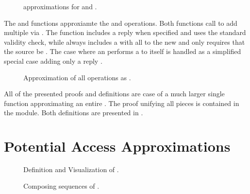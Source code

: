   
\begin{figure}
  \COQDOCcreateDepAG{}
  \COQDOCsendDepAG{}
  \COQDOCagAddCapsSend{}
  \COQDOCagAddCapsCreate{}
  \COQDOCagAddCapsByIndexPairList{}
  \COQDOCdirAccMDepCreate{}
  \COQDOCdirAccMDepSend{}
  \caption{\xmakefirstuc{\TMdirAcc} approximations for \TMsend{} and \TMcreate{}. \label{fig:safety:sendDepAG}\label{fig:safety:allocateDepAG}}
\end{figure}

The \COQagAddCapsSend{} and \COQagAddCapsCreate{} functions approxiamte the \TMsend{} and \TMcreate{} operations.
Both functions call \COQagAddCapsByIndexPairList{} to add multiple \TMcaps{} via \COQagAddCapByObjIndex{}.
The \COQagAddCapsSend{} function includes a reply \TMcap{} when specified and uses the standard validity check, while \COQagAddCapsCreate{} always includes a \TMcap{} with all \TMaccessRights{} to the new \TMobj{} and only requires that the source be \TMalive{}.
The case where an \TMobj{} performs a \TMsend{} \TMop{} to itself is handled as a simplified special case adding only a reply \TMcap{}.

\begin{figure}
  \COQDOCdirAccOp{}
  \COQDOCdirAccApproxDepOp{}
  \caption{Approximation of all operations as \COQdirAccOp{}.\label{fig:safety:dirAccOp}}
\end{figure}

\pagebreak[0]

All of the presented proofs and definitions are case of a much larger single function approximating an entire \TMop{}.
The proof unifying all pieces is contained in the \COQAttenuation{} module.
Both definitions are presented in .

\section{Potential Access Approximations}

\begin{figure}
  \begin{center}
    \FIGpotAccApproxCOQ{}
  \end{center}
  \COQDOCpotAccMDirAccDep{}
  \caption{Definition and Visualization of \COQpotAccApproxDirAccDep{}. \label{fig:safety:potAccApproxDirAccDep}}
\end{figure}

\begin{figure}
  \COQDOCpotAccMdirAccDepCompose{}
  \caption{Composing sequences of \TMpotAcc{} \TMops{}. \label{fig:safety:potAccApproxDirAccDepCompose}}
\end{figure}

